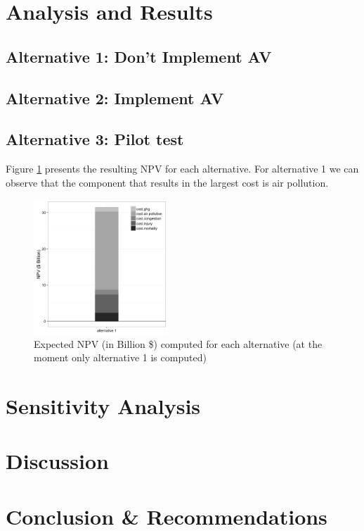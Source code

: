 \documentclass[11pt, letterpaper]{article}
\begin{document}
\section{Analysis and Results} \label{results}


\subsection{Alternative 1: Don't Implement AV}

\subsection{Alternative 2: Implement AV}

\subsection{Alternative 3: Pilot test}

Figure \ref{fig:alt1} presents the resulting NPV for each alternative. For alternative 1 we can observe that the component that results in the largest cost is air pollution.

\begin{figure}[H]
\begin{center}
\includegraphics[width=0.45\textwidth]{../../R/barplot1}
\caption{Expected NPV (in Billion \$) computed for each alternative (at the moment only alternative 1 is computed)}
\label{fig:alt1}
\end{center}
\end{figure}

\section{Sensitivity Analysis} \label{sensitivity}


\section{Discussion} \label{discussion}


\section{Conclusion \& Recommendations} \label{conclusion}

\end{document}
